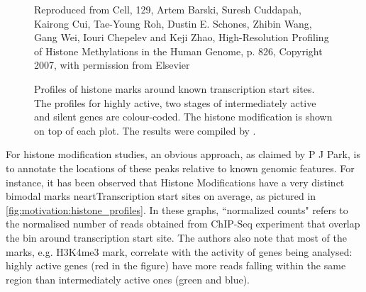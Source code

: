 \documentclass[parskip]{cs4rep}
\newcommand{\histonemodification}[1]{#1}
\begin{document}
\begin{figure}[p]
   \centering
   {Reproduced from Cell, 129, Artem Barski, Suresh Cuddapah, Kairong Cui, Tae-Young Roh, Dustin E. Schones, Zhibin Wang, Gang Wei, Iouri Chepelev and Keji Zhao, High-Resolution Profiling of Histone Methylations in the Human Genome\cite{Barski:2007ww}, p. 826, Copyright 2007, with permission from Elsevier}
   \caption{Profiles of histone marks around known transcription start sites. The profiles for highly active, two stages of intermediately active and silent genes are colour-coded. The histone modification is shown on top of each plot. The results were compiled by \cite{Barski:2007ww}.}
    \label{fig:motivation:histone_profiles}
\end{figure}

For histone modification studies, an obvious approach, as claimed by P J Park, is to annotate the locations of these peaks relative to known genomic features. For instance, it has been observed
that Histone Modifications have a very distinct bimodal marks neartTranscription start sites on average\cite{Barski:2007ww}, as pictured in \autoref{fig:motivation:histone_profiles}. In these graphs, ``normalized counts" refers to the normalised number of reads obtained from ChIP-Seq experiment that overlap the bin around transcription start site. The authors also note that most of the marks, e.g.
\histonemodification{H3K4me3} mark, correlate with the activity of genes being analysed: highly active genes (red in the figure) have more reads falling within the same region than intermediately active ones (green and blue).
\end{document}
